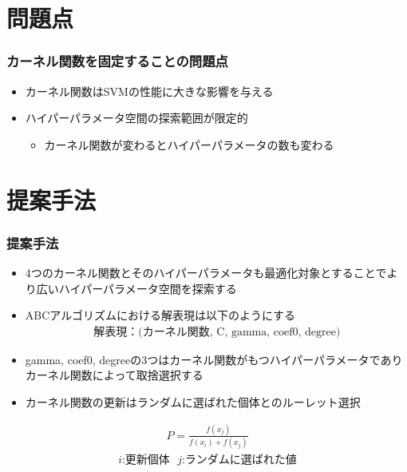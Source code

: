 \documentclass[11pt,dvipdfmx,cjk]{beamer}
\begin{document}
  \section{問題点}
  \begin{frame}
    \frametitle{カーネル関数を固定することの問題点}
    
    \begin{itemize}
      \item カーネル関数はSVMの性能に大きな影響を与える
     \item ハイパーパラメータ空間の探索範囲が限定的
    \begin{itemize}
      \item カーネル関数が変わるとハイパーパラメータの数も変わる
    \end{itemize}
  \end{itemize}
\end{frame}
  
  \section{提案手法}
  \begin{frame}
    \frametitle{提案手法}
    \begin{itemize}
      \item 4つのカーネル関数とそのハイパーパラメータも最適化対象とすることでより広いハイパーパラメータ空間を探索する 
      \item ABCアルゴリズムにおける解表現は以下のようにする
      \begin{align*}
        \text{解表現：(カーネル関数, C, gamma, coef0, degree)}
      \end{align*}
      \item gamma, coef0, degreeの3つはカーネル関数がもつハイパーパラメータでありカーネル関数によって取捨選択する 
      \item カーネル関数の更新はランダムに選ばれた個体とのルーレット選択  
    \end{itemize}
    \begin{align*}
      P = \frac{f(x_j)}{f(x_i)+f(x_j)}  
      \end{align*}
      \begin{align*}
      \text{$i$:更新個体~~$j$:ランダムに選ばれた値}
    \end{align*}
\end{frame}
  
  
\end{document}
